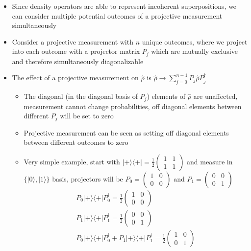 \documentclass[english]{article}
\newcommand{\ket}[1]{|#1 \rangle}
\newcommand{\ketbra}[2]{\vert #1 \rangle \! \langle #2 \vert}
\begin{document}
\begin{itemize}
\item Since density operators are able to represent incoherent superpositions, we can consider multiple potential outcomes of a projective measurement simultaneously
\item Consider a projective measurement with $n$ unique outcomes, where we project into each outcome with a projector matrix $P_j$ which are mutually exclusive and therefore simultaneously diagonalizable
\item The effect of a projective measurement on $\hat{\rho}$ is $\hat{\rho} \rightarrow \sum^{n-1}_{j=0} P_j\hat{\rho}P^\dagger_j$
\begin{itemize}
\item The diagonal (in the diagonal basis of $P_j$) elements of $\hat{\rho}$ are unaffected, measurement cannot change probabilities, off diagonal elements between different $P_j$ will be set to zero
\item Projective measurement can be seen as setting off diagonal elements between different outcomes to zero
\item Very simple example, start with $\ketbra{+}{+}=\frac{1}{2}\left(\begin{array}{cc} 1 & 1 \\ 1 & 1 \end{array}\right)$ and measure in $\{\ket{0},\ket{1}\}$ basis, projectors will be $P_0=\left(\begin{array}{cc} 1 & 0 \\ 0 & 0 \end{array}\right)$ and $P_1=\left(\begin{array}{cc} 0 & 0 \\ 0 & 1 \end{array}\right)$
\begin{align}
P_0\ketbra{+}{+}P^\dagger_0=\frac{1}{2}\left(\begin{array}{cc} 1 & 0 \\ 0 & 0 \end{array}\right) \\
P_1\ketbra{+}{+}P^\dagger_1=\frac{1}{2}\left(\begin{array}{cc} 0 & 0 \\ 0 & 1 \end{array}\right)\\
P_0\ketbra{+}{+}P^\dagger_0+P_1\ketbra{+}{+}P^\dagger_1=\frac{1}{2}\left(\begin{array}{cc} 1 & 0 \\ 0 & 1 \end{array}\right)

\end{align}
\end{itemize}
\end{itemize}
\end{document}
